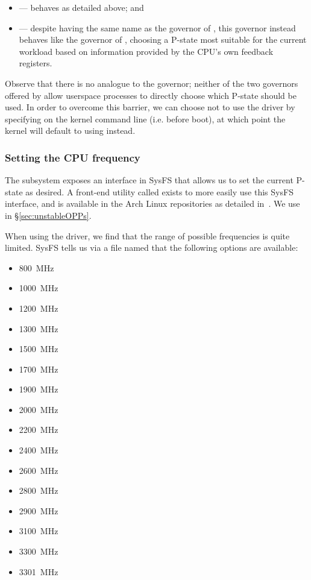 \begin{itemize}
    \item {} — behaves as detailed above; and
    \item {} — despite having the same name as the
         governor of , this governor instead
        behaves like the  governor of ,
        choosing a P-state most suitable for the current workload based on
        information provided by the CPU's own feedback registers.
\end{itemize}

Observe that there is no analogue to the  governor; neither of
the two governors offered by  allow userspace processes to
directly choose which P-state should be used. In order to overcome this barrier,
we can choose not to use the  driver by specifying
 on the kernel command line (i.e. before boot),
at which point the kernel will default to using  instead.

\subsubsection{Setting the CPU frequency}
\label{sec:cpupower}

The  subsystem exposes an interface in SysFS that allows us to
set the current P-state as desired. A front-end utility called 
exists to more easily use this SysFS interface, and is available in the Arch
Linux repositories as detailed in~\cite{archFrequency}. We use 
in §\ref{sec:unstableOPPs}.

When using the  driver, we find that the range of possible
frequencies is quite limited. SysFS tells us via a file named
 that the following options are available:

\begin{multicols}{3}\raggedcolumns
    \begin{itemize}
        \item 800~MHz
        \item 1000~MHz
        \item 1200~MHz
        \item 1300~MHz
        \item 1500~MHz
        \item 1700~MHz
        \item 1900~MHz
        \item 2000~MHz
        \item 2200~MHz
        \item 2400~MHz
        \item 2600~MHz
        \item 2800~MHz
        \item 2900~MHz
        \item 3100~MHz
        \item 3300~MHz
        \item 3301~MHz
    \end{itemize}
\end{multicols}


